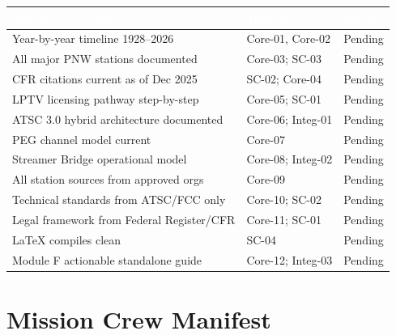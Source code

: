 \documentclass[11pt,letterpaper]{article}
\newcommand{\tableheader}[1]{\textbf{\sffamily\textcolor{white}{#1}}}
\begin{document}
\begin{center}
\begin{tabularx}{\textwidth}{L{5cm}L{3.5cm}C{2cm}}
\toprule
{}
\tableheader{Success Criterion} & \tableheader{Test IDs} & \tableheader{Status} \\
\midrule
Year-by-year timeline 1928--2026 & Core-01, Core-02 & Pending \\
All major PNW stations documented & Core-03; SC-03 & Pending \\
CFR citations current as of Dec 2025 & SC-02; Core-04 & Pending \\
LPTV licensing pathway step-by-step & Core-05; SC-01 & Pending \\
ATSC 3.0 hybrid architecture documented & Core-06; Integ-01 & Pending \\
PEG channel model current & Core-07 & Pending \\
Streamer Bridge operational model & Core-08; Integ-02 & Pending \\
All station sources from approved orgs & Core-09 & Pending \\
Technical standards from ATSC/FCC only & Core-10; SC-02 & Pending \\
Legal framework from Federal Register/CFR & Core-11; SC-01 & Pending \\
LaTeX compiles clean & SC-04 & Pending \\
Module F actionable standalone guide & Core-12; Integ-03 & Pending \\
\bottomrule
\end{tabularx}
\end{center}

\section{Mission Crew Manifest}
\end{document}
